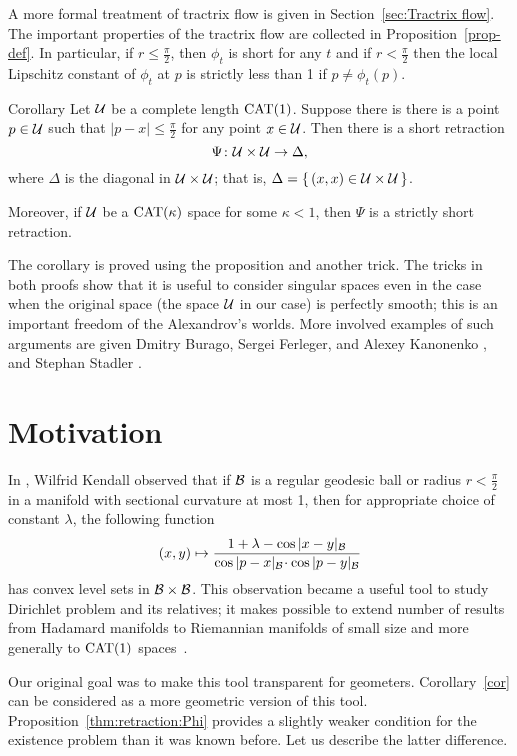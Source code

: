 \documentclass[oneside,a4paper, 12pt]{article}
\begin{document}
A more formal treatment of tractrix flow is given in Section~\ref{sec:Tractrix flow}.
The important properties of the tractrix flow are collected in Proposition~\ref{prop-def}.
In particular, if $r\le \tfrac\pi2$, then $\phi_t$ is short for any $t$ 
and if $r< \tfrac\pi2$ then the local Lipschitz constant of $\phi_t$ at $p$ is strictly less than 1 if $p\ne \phi_t(p)$.

\begin{thm}{Corollary}\label{cor}
Let $\mathcal{U}$ be a complete length $\mathrm{CAT}(1)$.
Suppose there is there is a point $p\in \mathcal{U}$ such that $|p-x|\le \tfrac\pi2$ for any point $x\in \mathcal{U}$.
Then there is a short retraction 
\[\Psi\colon\mathcal{U}\times \mathcal{U}\to \Delta,\]
where $\Delta$ is the diagonal in $\mathcal{U}\times \mathcal{U}$;
that is, $\Delta=\{\,(x,x)\in \mathcal{U}\times \mathcal{U}\,\}$.
 
Moreover, if $\mathcal{U}$ be a $\mathrm{CAT}(\kappa)$ space for some $\kappa<1$, then $\Psi$ is a strictly short retraction.
\end{thm}

The corollary is proved using the proposition and another trick. 
The tricks in both proofs show that it is useful to consider singular spaces even in the case when the original space (the space $\mathcal{U}$ in our case) is perfectly smooth;
this is an important freedom of the Alexandrov's worlds.
More involved examples of such arguments are given Dmitry Burago, Sergei Ferleger, and Alexey Kanonenko \cite{BFK}, and Stephan Stadler \cite{stadler}.


\section{Motivation}

In \cite[(4.1)]{kendall}, Wilfrid Kendall observed that if $\mathcal{B}$ is a regular geodesic ball or radius $r<\tfrac\pi2$ in a manifold with sectional curvature at most 1, then for appropriate choice of constant $\lambda$, the following function
\[(x,y)\mapsto 
\frac{1+\lambda-\cos|x-y|_{\spc{B}}}{\cos|p-x|_{\spc{B}}\cdot \cos|p-y|_{\spc{B}}}
\]
has convex level sets in ${\mathcal{B}}\times {\mathcal{B}}$.
This observation became a useful tool to study Dirichlet problem and its relatives;
it makes possible to extend number of results from Hadamard manifolds to Riemannian manifolds of small size
and more generally to $\mathrm{CAT}(1)$ spaces~\cite{yokota}. %

Our original goal was to make this tool transparent for geometers.
Corollary~\ref{cor} can be considered as a more geometric version of this tool.
Proposition~\ref{thm:retraction:Phi} provides a slightly weaker condition for the existence problem than it was known before.
Let us describe the latter difference. 
\end{document}

